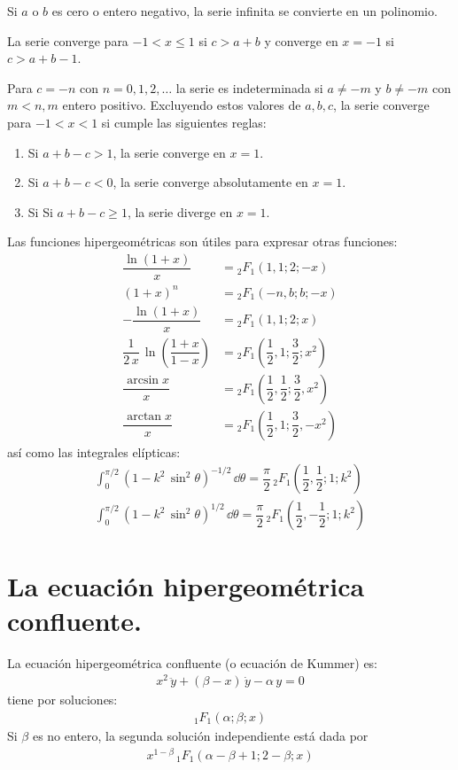 \par
Si $a$ o $b$ es cero o entero negativo, la serie infinita se convierte en un polinomio.
\par
La serie converge para $-1 < x \leq 1$ si $c > a + b$ y converge en $x = -1$ si $c > a + b - 1$.
\par
Para $c = -n$ con $n = 0, 1, 2, \ldots$ la serie es indeterminada si $a \neq -m$ y $b \neq -m$ con $m < n, m$ entero positivo. Excluyendo estos valores de $a, b, c$, la serie converge para $-1 < x < 1$ si cumple las siguientes reglas:
\begin{enumerate}[label=\alph*)]
\item Si $a + b - c > 1$, la serie converge en $x = 1$.
\item Si $a + b - c < 0$, la serie converge absolutamente en $x = 1$.
\item Si Si $a + b - c \geq 1$, la serie diverge en $x = 1$.
\end{enumerate}
Las funciones hipergeométricas son útiles para expresar otras funciones:
\begin{align*}
\dfrac{\ln (1 + x)}{x} &= {}_{2} F_{1}(1, 1; 2; -x) \\[1em]
(1 + x)^{n} &= {}_{2} F_{1}(-n, b; b; -x) \\[1em]
- \dfrac{\ln (1 + x)}{x} &= {}_{2} F_{1}(1, 1; 2; x) \\[1em]
\dfrac{1}{2 \, x} \, \ln \left( \dfrac{1 + x}{1 - x} \right)&= {}_{2} F_{1}\left( \dfrac{1}{2}, 1; \dfrac{3}{2}; x^{2} \right) \\[1em]
\dfrac{\arcsin x}{x} &= {}_{2} F_{1} \left( \dfrac{1}{2}, \dfrac{1}{2}; \dfrac{3}{2}, x^{2} \right) \\[1em]
\dfrac{\arctan x}{x} &= {}_{2} F_{1} \left( \dfrac{1}{2}, 1; \dfrac{3}{2}, -x^{2} \right)
\end{align*}
así como las integrales elípticas:
\begin{align*}
\int_{0}^{\pi/2} (1 - k^{2} \, \sin^{2} \theta)^{-1/2} \, \dd \theta = \dfrac{\pi}{2} \, {}_{2} F_{1} \left( \dfrac{1}{2}, \dfrac{1}{2}; 1; k^{2}  \right) \\[1em]
\int_{0}^{\pi/2} (1 - k^{2} \, \sin^{2} \theta)^{1/2} \, \dd \theta = \dfrac{\pi}{2} \, {}_{2} F_{1} \left( \dfrac{1}{2}, -\dfrac{1}{2}; 1; k^{2}  \right)
\end{align*}
\section{La ecuación hipergeométrica confluente.}
La ecuación hipergeométrica confluente (o ecuación de Kummer) es:
\begin{align*}
x^{2} \, \ddot{y} + (\beta - x) \, \dot{y} - \alpha \, y = 0
\end{align*}
tiene por soluciones:
\begin{align*}
{}_{1} F_{1} (\alpha; \beta; x)
\end{align*}
Si $\beta$ es no entero, la segunda solución independiente está dada por
\begin{align*}
x^{1-\beta} \, {}_{1} F_{1} (\alpha - \beta + 1; 2 - \beta; x)
\end{align*}
